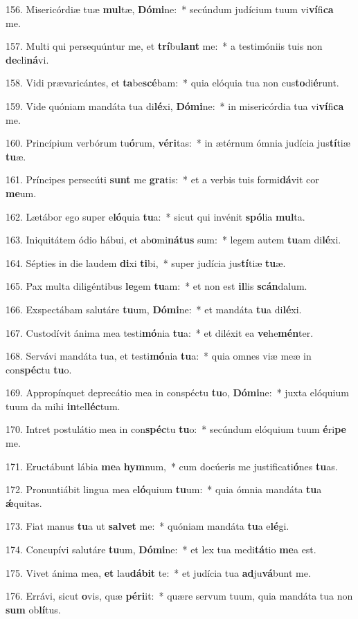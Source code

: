 156. Misericórdiæ tuæ \textbf{mul}tæ, \textbf{Dó}\textbf{mi}ne:~*  secúndum judícium tuum vi\textbf{ví}fi\textbf{ca} me.\

157. Multi qui persequúntur me, et \textbf{trí}bu\textbf{lant} me:~*  a testimóniis tuis non \textbf{de}cli\textbf{ná}vi.\

158. Vidi prævaricántes, et \textbf{ta}be\textbf{scé}bam:~*  quia elóquia tua non cus\textbf{to}di\textbf{é}runt.\

159. Vide quóniam mandáta tua di\textbf{lé}xi, \textbf{Dó}\textbf{mi}ne:~*  in misericórdia tua vi\textbf{ví}fi\textbf{ca} me.\

160. Princípium verbórum tu\textbf{ó}rum, \textbf{vé}\textbf{ri}tas:~*  in ætérnum ómnia judícia jus\textbf{tí}tiæ \textbf{tu}æ.\

161. Príncipes persecúti \textbf{sunt} me \textbf{gra}tis:~*  et a verbis tuis formi\textbf{dá}vit cor \textbf{me}um.\

162. Lætábor ego super e\textbf{ló}quia \textbf{tu}a:~*  sicut qui invénit \textbf{spó}lia \textbf{mul}ta.\

163. Iniquitátem ódio hábui, et ab\textbf{o}mi\textbf{ná}\textbf{tus} sum:~*  legem autem \textbf{tu}am di\textbf{lé}xi.\

164. Sépties in die laudem \textbf{di}xi \textbf{ti}bi,~*  super judícia jus\textbf{tí}tiæ \textbf{tu}æ.\

165. Pax multa diligéntibus \textbf{le}gem \textbf{tu}am:~*  et non est \textbf{il}lis \textbf{scán}dalum.\

166. Exspectábam salutáre \textbf{tu}um, \textbf{Dó}\textbf{mi}ne:~*  et mandáta \textbf{tu}a di\textbf{lé}xi.\

167. Custodívit ánima mea testi\textbf{mó}nia \textbf{tu}a:~*  et diléxit ea \textbf{ve}he\textbf{mén}ter.\

168. Servávi mandáta tua, et testi\textbf{mó}nia \textbf{tu}a:~*  quia omnes viæ meæ in con\textbf{spéc}tu \textbf{tu}o.\

169. Appropínquet deprecátio mea in conspéctu \textbf{tu}o, \textbf{Dó}\textbf{mi}ne:~*  juxta elóquium tuum da mihi \textbf{in}tel\textbf{léc}tum.\

170. Intret postulátio mea in con\textbf{spéc}tu \textbf{tu}o:~*  secúndum elóquium tuum \textbf{é}ri\textbf{pe} me.\

171. Eructábunt lábia \textbf{me}a \textbf{hym}num,~*  cum docúeris me justificati\textbf{ó}nes \textbf{tu}as.\

172. Pronuntiábit lingua mea e\textbf{ló}quium \textbf{tu}um:~*  quia ómnia mandáta \textbf{tu}a \textbf{ǽ}quitas.\

173. Fiat manus \textbf{tu}a ut \textbf{sal}\textbf{vet} me:~*  quóniam mandáta \textbf{tu}a e\textbf{lé}gi.\

174. Concupívi salutáre \textbf{tu}um, \textbf{Dó}\textbf{mi}ne:~*  et lex tua medi\textbf{tá}tio \textbf{me}a est.\

175. Vivet ánima mea, \textbf{et} lau\textbf{dá}\textbf{bit} te:~*  et judícia tua \textbf{ad}ju\textbf{vá}bunt me.\

176. Errávi, sicut \textbf{o}vis, quæ \textbf{pér}\textbf{i}it:~*  quære servum tuum, quia mandáta tua non \textbf{sum} ob\textbf{lí}tus.\

